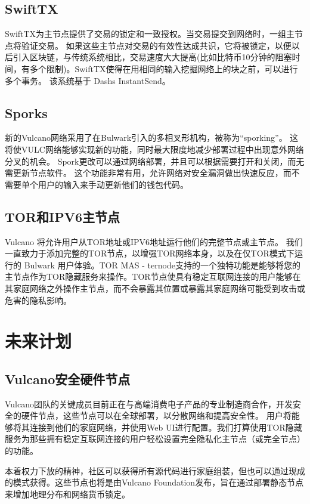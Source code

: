 \documentclass[A4paper, 12pt]{article}
\begin{document}
\subsection{SwiftTX}
SwiftTX为主节点提供了交易的锁定和一致授权。当交易提交到网络时，一组主节点将验证交易。  如果这些主节点对交易的有效性达成共识，它将被锁定，以便以后引入区块链，与传统系统相比，交易速度大大提高(比如比特币10分钟的阻塞时间，有多个限制)。SwiftTX使得在用相同的输入挖掘网络上的块之前，可以进行多个事务。  该系统基于 Dashs InstantSend。

\subsection{Sporks}
新的Vulcano网络采用了在Bulwark引入的多相叉形机构，被称为“sporking”。  这将使VULC网络能够实现新的功能，同时最大限度地减少部署过程中出现意外网络分叉的机会。  Spork更改可以通过网络部署，并且可以根据需要打开和关闭，而无需更新节点软件。   这个功能非常有用，允许网络对安全漏洞做出快速反应，而不需要单个用户的输入来手动更新他们的钱包代码。

\subsection{TOR和IPV6主节点}
Vulcano 将允许用户从TOR地址或IPV6地址运行他们的完整节点或主节点。  我们一直致力于添加完整的TOR节点，以增强TOR网络本身，以及在仅TOR模式下运行的 Bulwark 用户体验。TOR MAS - ternode支持的一个独特功能是能够将您的主节点作为TOR隐藏服务来操作。TOR节点使具有稳定互联网连接的用户能够在其家庭网络之外操作主节点，而不会暴露其位置或暴露其家庭网络可能受到攻击或危害的隐私影响。

\section{未来计划}
\subsection{Vulcano安全硬件节点}
Vulcano团队的关键成员目前正在与高端消费电子产品的专业制造商合作，开发安全的硬件节点，这些节点可以在全球部署，以分散网络和提高安全性。  用户将能够将其连接到他们的家庭网络，并使用Web UI进行配置。我们打算使用TOR隐藏服务为那些拥有稳定互联网连接的用户轻松设置完全隐私化主节点（或完全节点）的功能。

本着权力下放的精神，社区可以获得所有源代码进行家庭组装，但也可以通过现成的模式获得。这些节点也将是由Vulcano Foundation发布，旨在通过部署静态节点来增加地理分布和网络货币锁定。
\end{document}
